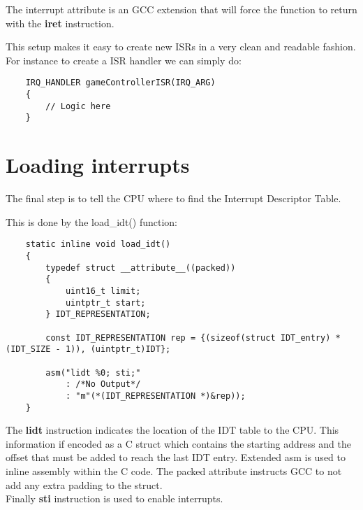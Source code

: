 The interrupt attribute is an GCC extension that will force the function to return with the \textbf{iret} instruction.

This setup makes it easy to create new ISRs in a very clean and readable fashion. For instance to create a ISR handler we can 
simply do:
\begin{lstlisting}
    IRQ_HANDLER gameControllerISR(IRQ_ARG)
    {
        // Logic here
    }
\end{lstlisting}
\pagebreak

\section{Loading interrupts}\label{section:Loading interrupts}
The final step is to tell the CPU where to find the Interrupt Descriptor Table.

\vspace{1cm}
This is done by the load\_idt() function:
\begin{lstlisting}
    static inline void load_idt()
    {
        typedef struct __attribute__((packed))
        {
            uint16_t limit;
            uintptr_t start;
        } IDT_REPRESENTATION;

        const IDT_REPRESENTATION rep = {(sizeof(struct IDT_entry) * (IDT_SIZE - 1)), (uintptr_t)IDT};

        asm("lidt %0; sti;"
            : /*No Output*/
            : "m"(*(IDT_REPRESENTATION *)&rep));
    }
\end{lstlisting}

\vspace{1cm}
The \textbf{lidt} instruction indicates the location of the IDT table to the CPU. This information if encoded as a C struct which
contains the starting address and the offset that must be added to reach the last IDT entry.
Extended asm is used to inline assembly within the C code. The packed attribute instructs GCC to not add any extra padding to the 
struct.\\
Finally \textbf{sti} instruction is used to enable interrupts.